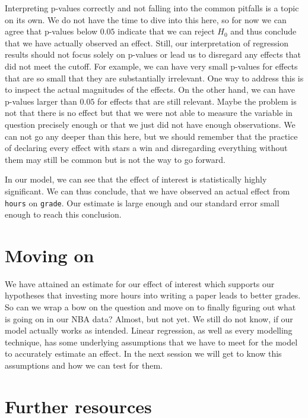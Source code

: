 \documentclass[
]{book}
\begin{document}
Interpreting p-values correctly and not falling into the common pitfalls is a
topic on its own. We do not have the time to dive into this here, so for now we
can agree that p-values below \(0.05\) indicate that we can reject \(H_0\) and thus
conclude that we have actually observed an effect. Still, our interpretation of
regression results should not focus solely on p-values or lead us to disregard
any effects that did not meet the cutoff. For example, we can have very small
p-values for effects that are so small that they are substantially irrelevant.
One way to address this is to inspect the actual magnitudes of the effects.
On the other hand, we
can have p-values larger than \(0.05\) for effects that are still relevant. Maybe
the problem is not that there is no effect but that we were not able to measure
the variable in question precisely enough or that we just did not have enough
observations. We can not go any deeper than this here, but we should remember
that the practice of declaring every effect with stars a win and disregarding
everything without them may still be common but is not the way to go forward.

In our model, we can see that the effect of interest is statistically
highly significant. We can thus conclude, that we have observed an actual effect
from \texttt{hours} on \texttt{grade}. Our estimate is large enough and our standard error
small enough to reach this conclusion.

\hypertarget{moving-on-2}{%
\section{Moving on}\label{moving-on-2}}

We have attained an estimate for our effect of interest which supports our
hypotheses that investing more hours into writing a paper leads to better grades.
So can we wrap a bow on the question and move on to finally figuring out what
is going on in our NBA data? Almost, but not yet. We still do not know, if our
model actually works as intended. Linear regression, as well as every modelling
technique, has some underlying assumptions that we have to meet for the model
to accurately estimate an effect. In the next session we will get to know this
assumptions and how we can test for them.

\hypertarget{further-resources-3}{%
\section{Further resources}\label{further-resources-3}}
\end{document}
